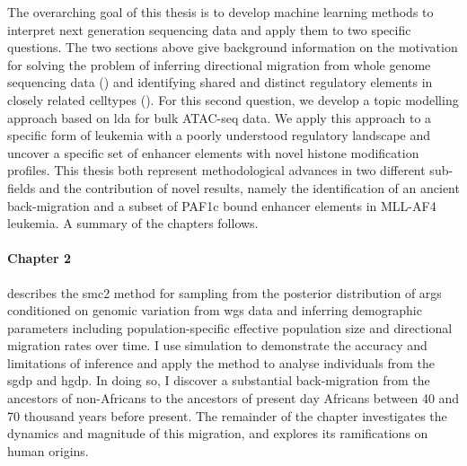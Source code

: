 The overarching goal of this thesis is to develop machine learning methods to interpret next generation sequencing data and apply them to two specific questions. The two sections above give background information on the motivation for solving the problem of inferring directional migration from whole genome sequencing data () and identifying shared and distinct regulatory elements in closely related celltypes (). For this second question, we develop a topic modelling approach based on \gls{lda} for bulk ATAC-seq data. We apply this approach to a specific form of leukemia with a poorly understood regulatory landscape and uncover a specific set of enhancer elements with novel histone modification profiles. This thesis both represent methodological advances in two different sub-fields and the contribution of novel results, namely the identification of an ancient back-migration and a subset of PAF1c bound enhancer elements in MLL-AF4 leukemia. A summary of the chapters follows.


\paragraph{Chapter 2} describes the \gls{smc2} method for sampling from the posterior distribution of \glspl{arg} conditioned on genomic variation from \gls{wgs} data and inferring demographic parameters including population-specific effective population size and directional migration rates over time. I use simulation to demonstrate the accuracy and limitations of inference and apply the method to analyse individuals from the \gls{sgdp} and \gls{hgdp}. In doing so, I discover a substantial back-migration from the ancestors of non-Africans to the ancestors of present day Africans between 40 and 70 thousand years before present. The remainder of the chapter investigates the dynamics and magnitude of this migration, and explores its ramifications on human origins.  

